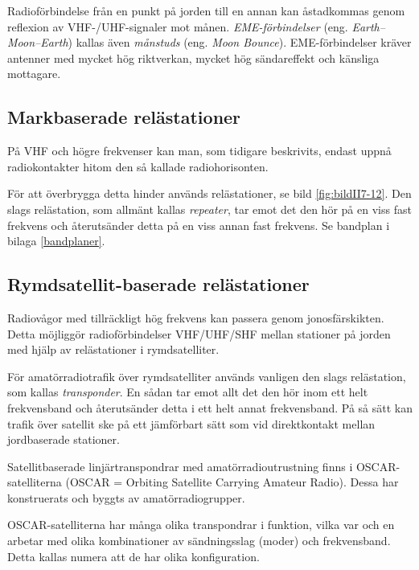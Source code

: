 Radioförbindelse från en punkt på jorden till en annan kan åstadkommas
genom reflexion av VHF-/UHF-signaler mot månen.
\emph{EME-förbindelser} (eng. \emph{Earth--Moon--Earth}) kallas även
\emph{månstuds} (eng. \emph{Moon Bounce}).
EME-förbindelser kräver antenner med mycket hög riktverkan, mycket hög
sändareffekt och känsliga mottagare.

\subsection{Markbaserade relästationer}


På VHF och högre frekvenser kan man, som tidigare beskrivits, endast
uppnå radiokontakter hitom den så kallade radiohorisonten.

För att överbrygga detta hinder används relästationer, se bild
\ref{fig:bildII7-12}.
Den slags relästation, som allmänt kallas \emph{repeater}, tar emot det den hör
på en viss fast frekvens och återutsänder detta på en viss annan fast frekvens.
Se bandplan i bilaga \ref{bandplaner}.

\subsection{Rymdsatellit-baserade relästationer}

Radiovågor med tillräckligt hög frekvens kan passera genom jonosfärskikten.
Detta möjliggör radioförbindelser VHF/UHF/SHF mellan
stationer på jorden med hjälp av relästationer i rymdsatelliter.

För amatörradiotrafik över rymdsatelliter används vanligen den slags
relästation, som kallas \emph{transponder}.
En sådan tar emot allt det den hör inom ett helt frekvensband och återutsänder
detta i ett helt annat frekvensband.
På så sätt kan trafik över satellit ske på ett jämförbart sätt som vid
direktkontakt mellan jordbaserade stationer.

Satellitbaserade linjärtranspondrar med amatörradioutrustning finns i
OSCAR-satelliterna (OSCAR = Orbiting Satellite Carrying Amateur Radio).
Dessa har konstruerats och byggts av amatörradiogrupper.

OSCAR-satelliterna har många olika transpondrar i funktion, vilka var och en
arbetar med olika kombinationer av sändningsslag (moder) och frekvensband.
Detta kallas numera att de har olika konfiguration.

